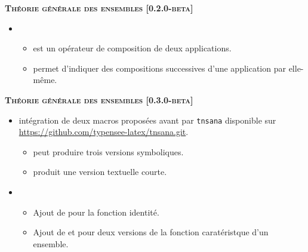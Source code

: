\separation




\begin{center}
    \textbf{\textsc{Théorie générale des ensembles [0.2.0-beta]}}
\end{center}

\begin{itemize}[itemsep=.5em]
    \item {}
    \begin{itemize}[itemsep=.5em]
        \item {} est un opérateur de composition de deux applications.

        \item {} permet d'indiquer des compositions successives d'une application par elle-même.
    \end{itemize}
\end{itemize}


\begin{center}
    \textbf{\textsc{Théorie générale des ensembles [0.3.0-beta]}}
\end{center}

\begin{itemize}[itemsep=.5em]
    \item {}
          intégration de deux macros proposées avant par \verb#tnsana# disponible sur \url{https://github.com/typensee-latex/tnsana.git}.

    \begin{itemize}[itemsep=.5em]
        \item {} peut produire trois versions symboliques.

        \item {} produit une version textuelle courte.
    \end{itemize}


    \item {}

    \begin{itemize}[itemsep=.5em]
        \item Ajout de  pour la fonction identité.

        \item Ajout de  et  pour deux versions de la fonction caratéristque d'un ensemble.
    \end{itemize}
\end{itemize}


\separation
